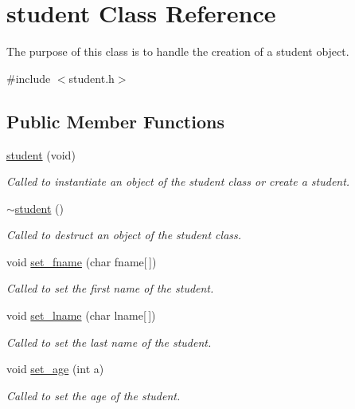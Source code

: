 \hypertarget{classstudent}{\section{student Class Reference}
\label{classstudent}
}


The purpose of this class is to handle the creation of a student object.  




{\ttfamily \#include $<$student.\-h$>$}

\subsection*{Public Member Functions}
\begin{DoxyCompactItemize}
\item 
\hyperlink{classstudent_a6c16ec6057a6ad989a4a10ffc755b33d}{student} (void)
\begin{DoxyCompactList}\small\item\em Called to instantiate an object of the student class or create a student. \end{DoxyCompactList}\item 
\hyperlink{classstudent_a102d321793438dd827305764bf59f86c}{$\sim$student} ()
\begin{DoxyCompactList}\small\item\em Called to destruct an object of the student class. \end{DoxyCompactList}\item 
void \hyperlink{classstudent_ad98acf8c6c9f3aa8954896bc3c88aa5a}{set\-\_\-fname} (char fname\mbox{[}$\,$\mbox{]})
\begin{DoxyCompactList}\small\item\em Called to set the first name of the student. \end{DoxyCompactList}\item 
void \hyperlink{classstudent_ab786a010a3f2bbe00bd2bef00d1a8866}{set\-\_\-lname} (char lname\mbox{[}$\,$\mbox{]})
\begin{DoxyCompactList}\small\item\em Called to set the last name of the student. \end{DoxyCompactList}\item 
void \hyperlink{classstudent_a518673bdd4e118b08b55d257c59e567e}{set\-\_\-age} (int a)
\begin{DoxyCompactList}\small\item\em Called to set the age of the student. \end{DoxyCompactList}\item 

\end{DoxyCompactItemize}
